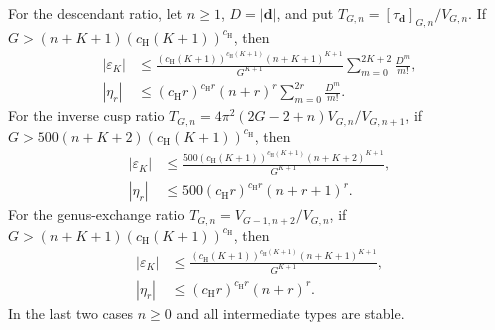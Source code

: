 \begin{prp}[WP inputs]
For the descendant ratio, let $n\geq1$, $D=|\mathbf d|$, and put
$T_{G,n}=[\tau_{\mathbf d}]_{G,n}/V_{G,n}$. If
$G>(n+K+1)(c_{\mathrm H}(K+1))^{c_{\mathrm H}}$, then
\begin{equation}
\label{eq:s03:hmt-descendant}
\begin{split}
|\varepsilon_K|&\leq
 \frac{(c_{\mathrm H}(K+1))^{c_{\mathrm H}(K+1)}
       (n+K+1)^{K+1}}{G^{K+1}}
 \sum_{m=0}^{2K+2}\frac{D^m}{m!},\\
|\eta_r|&\leq(c_{\mathrm H}r)^{c_{\mathrm H}r}(n+r)^r
 \sum_{m=0}^{2r}\frac{D^m}{m!}.
\end{split}
\end{equation}
For the inverse cusp ratio
$T_{G,n}=4\pi^2(2G-2+n)V_{G,n}/V_{G,n+1}$, if
$G>500(n+K+2)(c_{\mathrm H}(K+1))^{c_{\mathrm H}}$, then
\begin{equation}
\label{eq:s03:hmt-cusp}
\begin{split}
|\varepsilon_K|&\leq
 \frac{500(c_{\mathrm H}(K+1))^{c_{\mathrm H}(K+1)}
       (n+K+2)^{K+1}}{G^{K+1}},\\
|\eta_r|&\leq500(c_{\mathrm H}r)^{c_{\mathrm H}r}(n+r+1)^r.
\end{split}
\end{equation}
For the genus-exchange ratio $T_{G,n}=V_{G-1,n+2}/V_{G,n}$, if
$G>(n+K+1)(c_{\mathrm H}(K+1))^{c_{\mathrm H}}$, then
\begin{equation}
\label{eq:s03:hmt-genus}
\begin{split}
|\varepsilon_K|&\leq
 \frac{(c_{\mathrm H}(K+1))^{c_{\mathrm H}(K+1)}
       (n+K+1)^{K+1}}{G^{K+1}},\\
|\eta_r|&\leq(c_{\mathrm H}r)^{c_{\mathrm H}r}(n+r)^r.
\end{split}
\end{equation}
In the last two cases $n\geq0$ and all intermediate types are stable.
\end{prp}
